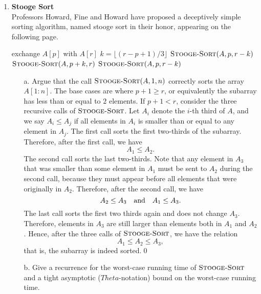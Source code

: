 \documentclass[12pt,reqno]{amsart}
\newif\ifanswer
\begin{document}
\begin{enumerate}[1.]
\item \textbf{Stooge Sort}\\ Professors Howard, Fine and Howard have proposed a deceptively simple sorting algorithm, named stooge sort in their honor, appearing on the following page.
\begin{algorithm}
    \caption{$\textsc{Stooge-Sort}(A, p, r)$}
    \begin{algorithmic}[1]
            \STATE exchange $A[p]$ with $A[r]$
        \ENDIF
            \STATE $k = \lfloor (r - p + 1) / 3 \rfloor$
            \STATE $\textsc{Stooge-Sort}(A, p, r - k)$
            \STATE $\textsc{Stooge-Sort}(A, p + k, r)$
            \STATE $\textsc{Stooge-Sort}(A, p, r - k)$
        \ENDIF
    \end{algorithmic}
\end{algorithm}
\newpage
\begin{enumerate}
    \item[a.] Argue that the call $\textsc{Stooge-Sort}(A, 1, n)$ correctly sorts the array $A[1: n]$.
    \ifanswer
    \noindent {\bf \\Solution}
    The base cases are where $p + 1 \geq r$, or equivalently the subarray has less than or equal to $2$ elements. If $p + 1 < r$, consider the three recursive calls of $\textsc{Stooge-Sort}$. Let $A_i$ denote the $i$-th third of $A$, and we say $A_i \leq A_j$ if all elements in $A_i$ is smaller than or equal to any element in $A_j$. The first call sorts the first two-thirds of the subarray. Therefore, after the first call, we have
    $$
    A_1 \leq A_2.
    $$
    The second call sorts the last two-thirds. Note that any element in $A_3$ that was smaller than some element in $A_1$ must be sent to $A_2$ during the second call, because they must appear before all elements that were originally in $A_2$. Therefore, after the second call, we have
    $$
    A_2 \leq A_3\quad\textup{and}\quad A_1 \leq A_3.
    $$
    The last call sorts the first two thirds again and does not change $A_3$. Therefore, elements in $A_3$ are still larger than elements both in $A_1$ and $A_2$. Hence, after the three calls of $\textsc{Stooge-Sort}$, we have the relation
    $$
    A_1 \leq A_2 \leq A_3,
    $$
    that is, the subarray is indeed sorted.\qed
    \item[b.] Give a recurrence for the worst-case running time of $\textsc{Stooge-Sort}$ and a tight asymptotic ($Theta$-notation) bound on the worst-case running time.
    \ifanswer
    \noindent {\bf \\Solution}

\end{enumerate}
\end{enumerate}
\end{document}

